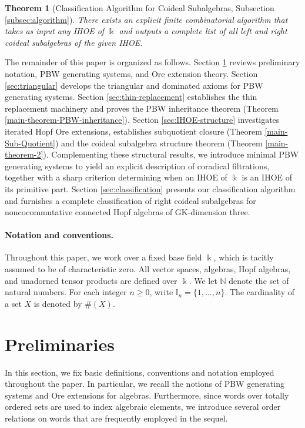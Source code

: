 \documentclass{article}
\theoremstyle{plain}
\newtheorem{thm}{Theorem}[section]
\theoremstyle{definition}
\numberwithin{equation}{section}
\newcommand{\II}{\mathbb{I}}
\begin{document}
	\begin{thm}[Classification Algorithm for Coideal Subalgebras, Subsection \ref{subsec:algorithm}]
		\label{thm-algorithm}
		There exists an explicit finite combinatorial algorithm that takes as input any IHOE of $\Bbbk$ and outputs a complete list of all left and right coideal subalgebras of the given IHOE.
	\end{thm}
	
	The remainder of this paper is organized as follows. Section \ref{sec:prelim} reviews preliminary notation, PBW generating systems, and Ore extension theory. Section \ref{sec:triangular} develops the triangular and dominated axioms for PBW generating systems. Section \ref{sec:thin-replacement} establishes the thin replacement machinery and proves the PBW inheritance theorem (Theorem \ref{main-theorem-PBW-inheritance}). Section \ref{sec:IHOE-structure} investigates iterated Hopf Ore extensions, establishes subquotient closure (Theorem \ref{main-Sub-Quotient}) and the coideal subalgebra structure theorem (Theorem \ref{main-theorem-2}). Complementing these structural results, we introduce minimal PBW generating systems to yield an explicit description of coradical filtrations, together with a sharp criterion determining when an IHOE of $\Bbbk$ is an IHOE  of  its primitive part. Section \ref{sec:classification} presents our  classification algorithm and furnishes a complete classification of  right coideal subalgebras for noncocommutative  connected Hopf algebras of GK-dimension three.
	
	
	
	\paragraph{Notation and conventions.}
	Throughout this paper, we work over a fixed base field $\Bbbk$, which is tacitly assumed to be of characteristic zero. All vector spaces, algebras, Hopf algebras, and unadorned tensor products are defined over $\Bbbk$. We let $\mathbb{N}$ denote the set of natural numbers. For each integer $n\ge 0$, write $\II_{n} = \{1,\dots, n\}$. The cardinality of a set $X$ is denoted by $\#(X)$.
	
	
	\section{Preliminaries}
	\label{sec:prelim}
	
	In this section, we fix basic definitions, conventions and notation employed throughout the paper. In particular, we recall the notions of PBW generating systems and Ore extensions for algebras. Furthermore, since words over totally ordered sets are used to index algebraic elements, we introduce several order relations on words that are frequently employed in the sequel.
	
\end{document}
